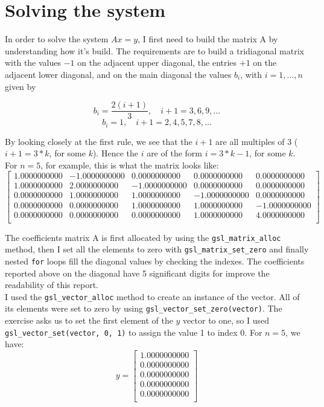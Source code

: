 \documentclass{article}
\newcommand{\code}{\texttt}
\begin{document}
\section{Solving the system}
In order to solve the system $Ax=y$, I first need to build the matrix A by understanding how it's build. The requirements are to build a tridiagonal matrix with the values $-1$ on the adjacent upper diagonal, the entries $+1$ on the adjacent lower diagonal, and on the main diagonal the values $b_{i}$, with $i = 1, \ldots, n$ given by

$$b_i =\frac{2(i+1)}{3},\quad i + 1= 3, 6, 9,\ldots$$
$$b_i =1,\quad i + 1 = 2, 4, 5, 7, 8, \ldots$$

By looking closely at the first rule, we see that the $i+1$ are all multiples of 3 ($i+1 = 3*k$, for some $k$). Hence the $i$ are of the form $i = 3*k-1$, for some $k$. For $n = 5$, for example, this is what the matrix looks like:
$$
\begin{bmatrix}
1.0000000000 & -1.0000000000 & 0.0000000000 & 0.0000000000 & 0.0000000000 \\
1.0000000000 & 2.0000000000 & -1.0000000000 & 0.0000000000 & 0.0000000000 \\
0.0000000000 & 1.0000000000 & 1.0000000000 & -1.0000000000 & 0.0000000000 \\ 
0.0000000000 & 0.0000000000 & 1.0000000000 & 1.0000000000 & -1.0000000000 \\ 
0.0000000000 & 0.0000000000 & 0.0000000000 & 1.0000000000 & 4.0000000000 \\\end{bmatrix}
$$

The coefficients matrix A is first allocated by using the \code{gsl\_matrix\_alloc} method, then I set all the elements to zero with \code{gsl\_matrix\_set\_zero} and finally nested \code{for} loops fill the diagonal values by checking the indexes. The coefficients reported above on the diagonal have 5 significant digits for improve the readability of this report.\\

I used the \code{gsl\_vector\_alloc} method to create an instance of the vector. All of its elements were set to zero by using \code{gsl\_vector\_set\_zero(vector)}. The exercise asks us to set the first element of the $y$ vector to one, so I used \code{gsl\_vector\_set(vector, 0, 1)} to assign the value 1 to index 0. For $n=5$, we have:
$$
y=
\begin{bmatrix}
1.0000000000 \\
0.0000000000 \\
0.0000000000 \\
0.0000000000 \\
0.0000000000 \\
\end{bmatrix}
$$
\end{document}
